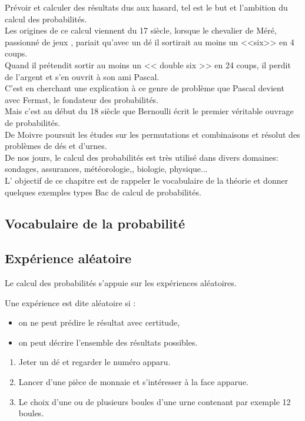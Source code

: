 


  

 Prévoir et calculer  des résultats dus  aux hasard, tel est    le but et l'ambition du calcul  des probabilités.\\
Les origines de ce calcul viennent du  17 siècle, lorsque le chevalier   de Méré, passionné  de jeux , pariait qu'avec  un dé il  sortirait  au moins  un  <<six>>
  en 4 coups.\\
Quand  il prétendit sortir  au moins un << double six >>  en 24 coups, il perdit de l'argent et s'en ouvrit  à son ami Pascal.\\
C'est  en cherchant une explication  à ce genre de problème que Pascal devient avec Fermat, le fondateur des probabilités.\\Mais c'est au début du 18 siècle  que Bernoulli  écrit le premier véritable ouvrage de probabilités.\\ De Moivre  poursuit les études sur les permutations et combinaisons et résolut des problèmes  de dés et d'urnes.\\
De nos jours, le calcul des probabilités est très utilisé dans divers domaines: sondages,   assurances, météorologie,, biologie, physique...\\L' objectif de ce  chapitre  est de rappeler le vocabulaire de la théorie  et donner  quelques exemples types Bac de calcul de probabilités. 


\subsection{Vocabulaire de la probabilité}

\subsection*{Expérience aléatoire}
Le calcul des probabilités s'appuie sur les expériences aléatoires.


\begin{definition}
 Une expérience est dite aléatoire si :
 \begin{itemize}
 \item  on ne peut prédire le résultat avec certitude,
 \item on peut décrire l'ensemble des résultats possibles.
 \end{itemize}
\end{definition}

\begin{example}
\begin{enumerate}
\item Jeter un dé et regarder le  numéro apparu.
\item Lancer d'une pièce de monnaie et s'intéresser à la face apparue. 
 \item Le choix d'une ou de plusieurs boules d'une urne contenant  par exemple 12 boules. 
\end{enumerate}
\end{example}

